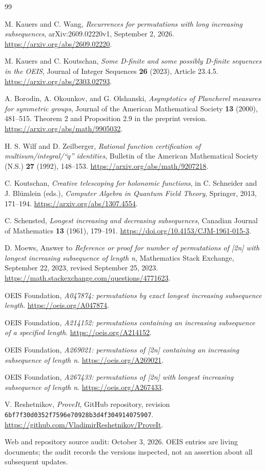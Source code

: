 \documentclass[11pt,letterpaper]{article}
\numberwithin{equation}{section}
\theoremstyle{definition}
\begin{document}
\begin{thebibliography}{99}
M. Kauers and C. Wang,
\emph{Recurrences for permutations with long increasing subsequences},
arXiv:2609.02220v1, September 2, 2026.
\url{https://arxiv.org/abs/2609.02220}.

M. Kauers and C. Koutschan,
\emph{Some D-finite and some possibly D-finite sequences in the OEIS},
Journal of Integer Sequences \textbf{26} (2023), Article 23.4.5.
\url{https://arxiv.org/abs/2303.02793}.

A. Borodin, A. Okounkov, and G. Olshanski,
\emph{Asymptotics of Plancherel measures for symmetric groups},
Journal of the American Mathematical Society \textbf{13} (2000),
481--515. Theorem 2 and Proposition 2.9 in the preprint version.
\url{https://arxiv.org/abs/math/9905032}.

H. S. Wilf and D. Zeilberger,
\emph{Rational function certification of multisum/integral/``$q$'' identities},
Bulletin of the American Mathematical Society (N.S.) \textbf{27} (1992),
148--153.
\url{https://arxiv.org/abs/math/9207218}.

C. Koutschan,
\emph{Creative telescoping for holonomic functions},
in C. Schneider and J. Bl\"umlein (eds.),
\emph{Computer Algebra in Quantum Field Theory}, Springer, 2013,
171--194.
\url{https://arxiv.org/abs/1307.4554}.

C. Schensted,
\emph{Longest increasing and decreasing subsequences},
Canadian Journal of Mathematics \textbf{13} (1961), 179--191.
\url{https://doi.org/10.4153/CJM-1961-015-3}.

D. Moews,
Answer to \emph{Reference or proof for number of permutations of [2n]
with longest increasing subsequence of length n},
Mathematics Stack Exchange, September 22, 2023, revised September 25, 2023.
\url{https://math.stackexchange.com/questions/4771623}.

OEIS Foundation, \emph{A047874: permutations by exact longest increasing
subsequence length}. \url{https://oeis.org/A047874}.

OEIS Foundation, \emph{A214152: permutations containing an increasing
subsequence of a specified length}. \url{https://oeis.org/A214152}.

OEIS Foundation, \emph{A269021: permutations of [2n] containing an
increasing subsequence of length n}. \url{https://oeis.org/A269021}.

OEIS Foundation, \emph{A267433: permutations of [2n] with longest
increasing subsequence of length n}. \url{https://oeis.org/A267433}.

V. Reshetnikov, \emph{ProveIt}, GitHub repository,
revision {\small\texttt{6bf7f30d0352f7596e70928b3d4f304914075907}}.
\url{https://github.com/VladimirReshetnikov/ProveIt}.
\end{thebibliography}
\noindent\small Web and repository source audit: October 3, 2026.
OEIS entries are living documents; the audit records the versions inspected,
not an assertion about all subsequent updates.
\end{document}
